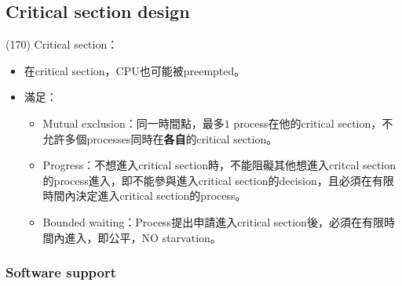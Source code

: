 \subsection{Critical section design}

\begin{theorem}{(170)} Critical section： \begin{itemize}
        \item 在critical section，CPU也可能被preempted。
        \item 滿足：\begin{itemize}
            \item Mutual exclusion：同一時間點，最多$1$ process在他的critical section，不允許多個processes同時在\textbf{各自}的critical section。
            \item Progress：不想進入critical section時，不能阻礙其他想進入critcal section的process進入，即不能參與進入critical section的decision，且必須在有限時間內決定進入critical section的process。
            \item Bounded waiting：Process提出申請進入critical section後，必須在有限時間內進入，即公平，NO starvation。
        \end{itemize}
    \end{itemize}
\end{theorem}

\subsubsection{Software support}

